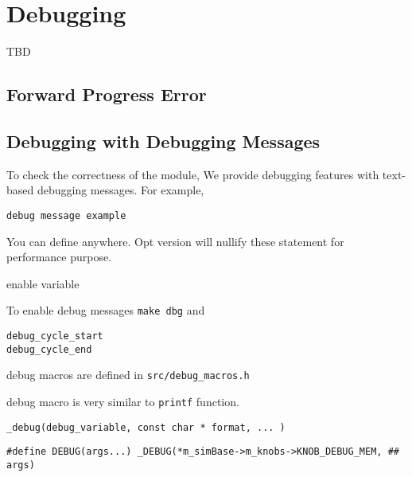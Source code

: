 \chapter{Debugging}
\label{sec:debugging}

TBD 

\section{Forward Progress Error}


\section{Debugging with Debugging Messages}

To check the correctness of the module, We provide debugging features
with text-based debugging messages. For example,

\begin{Verbatim}
debug message example
\end{Verbatim}

You can define anywhere. Opt version will nullify these statement for
performance purpose.

enable variable

To enable debug messages \Verb+make dbg+ and 

\begin{Verbatim}
debug_cycle_start
debug_cycle_end
\end{Verbatim}

debug macros are defined in \Verb+src/debug_macros.h+

debug macro is very similar to \Verb+printf+ function.

\begin{Verbatim}
_debug(debug_variable, const char * format, ... )
\end{Verbatim}

\begin{Verbatim}
#define DEBUG(args...) _DEBUG(*m_simBase->m_knobs->KNOB_DEBUG_MEM, ## args)
\end{Verbatim}



